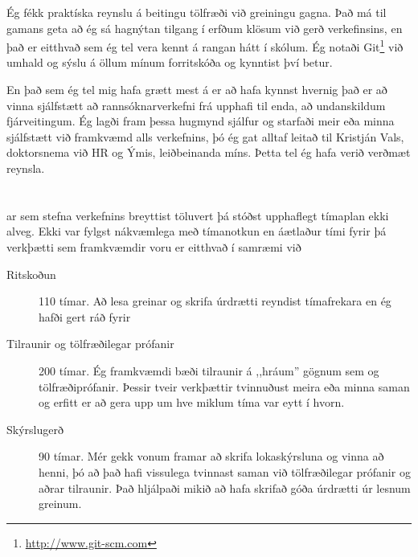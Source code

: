 \documentclass[a4paper]{article}           %
\newcommand{\tmpsection}[1]{}
\let\tmpsection=\section
\renewcommand{\section}[2]{

    \ifthenelse{
      \equal{#2}{Heimildir} %
    }
    {
      \tmpsection{\sc{#1} }
      \tmpsection{\sc{#2} }
    }
    {\tmpsection{\sc{#1} } }
      

}
\begin{document}
Ég fékk praktíska reynslu á beitingu tölfræði við greiningu gagna. Það má til gamans geta að ég sá hagnýtan tilgang í erfðum klösum við gerð verkefinsins, en það er eitthvað sem ég tel vera kennt á rangan hátt í skólum. Ég notaði Git\footnote{\url{http://www.git-scm.com}} við umhald og sýslu á öllum mínum forritskóða og kynntist því betur. 

En það sem ég tel mig hafa grætt mest á er að hafa kynnst hvernig það er að vinna sjálfstætt að rannsóknarverkefni frá upphafi til enda, að undanskildum fjárveitingum. Ég lagði fram þessa hugmynd sjálfur og starfaði meir eða minna sjálfstætt við framkvæmd alls verkefnins, þó ég gat alltaf leitað til Kristján Vals, doktorsnema við HR og Ýmis, leiðbeinanda míns. Þetta tel ég hafa verið verðmæt reynsla. 

\section{Tími}

Þar sem stefna verkefnins breyttist töluvert þá stóðst upphaflegt tímaplan ekki alveg. Ekki var fylgst nákvæmlega með tímanotkun en áætlaður tími fyrir þá verkþætti sem framkvæmdir voru er eitthvað í samræmi við 

\begin{description}
\item[Ritskoðun] 110 tímar. Að lesa greinar og skrifa úrdrætti reyndist tímafrekara en ég hafði gert ráð fyrir
\item[Tilraunir og tölfræðilegar prófanir] 200 tímar. Ég framkvæmdi bæði tilraunir á ,,hráum'' gögnum sem og tölfræðiprófanir. Þessir tveir verkþættir tvinnuðust meira eða minna saman og erfitt er að gera upp um hve miklum tíma var eytt í hvorn.
\item[Skýrslugerð] 90 tímar. Mér gekk vonum framar að skrifa lokaskýrsluna og vinna að henni, þó að það hafi vissulega tvinnast saman við tölfræðilegar prófanir og aðrar tilraunir. Það hljálpaði mikið að hafa skrifað góða úrdrætti úr lesnum greinum. 
\end{description}



\end{document}
